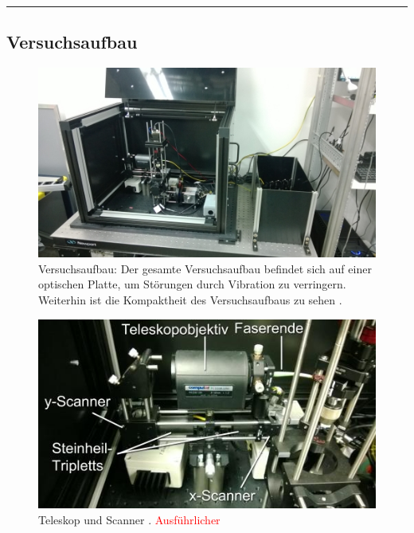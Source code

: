  \nopagebreak
 \hrule height 0pt
 \pagebreak[2]

\subsection{Versuchsaufbau}

\begin{minipage}{\linewidth}
\begin{figure}[H]
	\centering
\includegraphics[width=1.0\linewidth]{IMAGE/versuchsaufbau.png}
	\caption{Versuchsaufbau: Der gesamte Versuchsaufbau befindet sich auf einer optischen Platte, um Störungen durch Vibration zu verringern. Weiterhin ist die Kompaktheit des Versuchsaufbaus zu sehen \cite{Anleitung}.}
	\label{fig:versuchsaufbau}
\end{figure} 

\begin{figure}[H]
	\centering
\includegraphics[width=1.0\linewidth]{IMAGE/scanner.jpeg}
	\caption{Teleskop und Scanner \cite{Anleitung}. \textcolor{red}{Ausführlicher}}
	\label{fig:scanner}
\end{figure}

\end{minipage}

